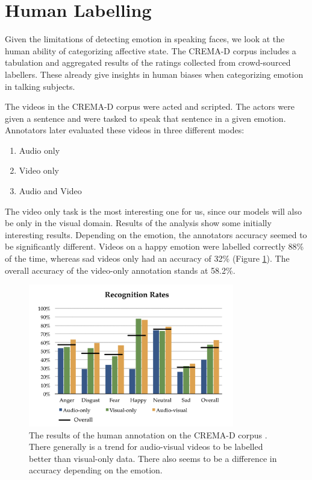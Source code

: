 \section{Human Labelling}
\label{sec:human}
Given the limitations of detecting emotion in speaking faces, we look at the human ability of categorizing affective state. The CREMA-D corpus \cite{cao2014crema} includes a tabulation and aggregated results of the ratings collected from crowd-sourced labellers. These already give insights in human biases when categorizing emotion in talking subjects.

The videos in the CREMA-D corpus were acted and scripted. The actors were given a sentence and were tasked to speak that sentence in a given emotion. Annotators later evaluated these videos in three different modes:

\begin{enumerate}
    \item Audio only
    \item Video only
    \item Audio and Video
\end{enumerate}

The video only task is the most interesting one for us, since our models will also be only in the visual domain. Results of the analysis show some initially interesting results. Depending on the emotion, the annotators accuracy seemed to be significantly different. Videos on a happy emotion were labelled correctly 88\% of the time, whereas sad videos only had an accuracy of 32\% (Figure \ref{fig:crema_results}). The overall accuracy of the video-only annotation stands at 58.2\%.

\begin{figure}
    \centering
    \includegraphics[width=0.8\textwidth]{res/crema.png}
    \caption{The results of the human annotation on the CREMA-D corpus \cite{cao2014crema}. There generally is a trend for audio-visual videos to be labelled better than visual-only data. There also seems to be a difference in accuracy depending on the emotion.}
    \label{fig:crema_results}
\end{figure}

